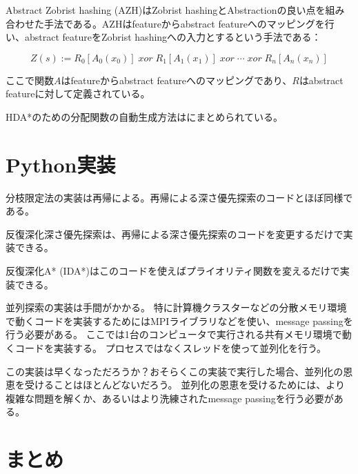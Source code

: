 Abstract Zobrist hashing (AZH)はZobrist hashingとAbstractionの良い点を組み合わせた手法である\cite{jinnai2016structured}。AZHはfeatureからabstract featureへのマッピングを行い、abstract featureをZobrist hashingへの入力とするという手法である：

\begin{equation}
\label{eq:abstract-zobrist}
 	Z(s) := R_{0}[A_0(x_{0})]\; xor\; R_{1}[A_1(x_{1})]\; xor\; \cdots\; xor\; R_{n}[A_n(x_{n})]%
\end{equation}

ここで関数$A$はfeatureからabstract featureへのマッピングであり、$R$はabstract featureに対して定義されている。

HDA*のための分配関数の自動生成方法は\cite{jinnai2017work}にまとめられている。


\section{Python実装}

分枝限定法の実装は再帰による。再帰による深さ優先探索のコードとほぼ同様である。


反復深化深さ優先探索は、再帰による深さ優先探索のコードを変更するだけで実装できる。


反復深化A* (IDA*)はこのコードを使えばプライオリティ関数を変えるだけで実装できる。


並列探索の実装は手間がかかる。
特に計算機クラスターなどの分散メモリ環境で動くコードを実装するためにはMPIライブラリなどを使い、message passingを行う必要がある。
ここでは1台のコンピュータで実行される共有メモリ環境で動くコードを実装する。
プロセスではなくスレッドを使って並列化を行う。


この実装は早くなっただろうか？おそらくこの実装で実行した場合、並列化の恩恵を受けることはほとんどないだろう。
並列化の恩恵を受けるためには、より複雑な問題を解くか、あるいはより洗練されたmessage passingを行う必要がある。



\section{まとめ}

